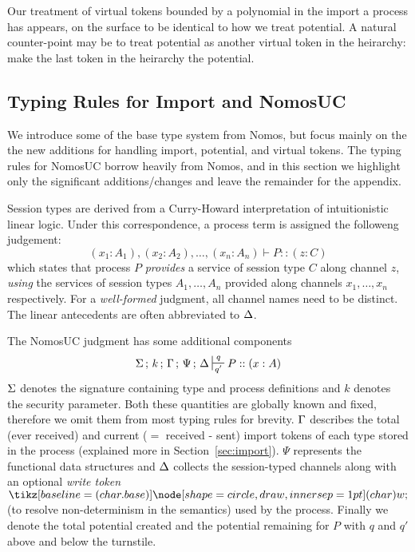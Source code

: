 Our treatment of virtual tokens bounded by a polynomial in the import a process has appears, on the surface to be identical to how we treat potential.
A natural counter-point may be to treat potential as another virtual token in the heirarchy: make the last token in the heirarchy the potential.




\subsection{Typing Rules for Import and NomosUC}
We introduce some of the base type system from Nomos, but focus mainly on the the new additions for handling import, potential, and virtual tokens. 
The typing rules for NomosUC borrow heavily from Nomos, and in this section we highlight only the significant additions/changes and leave the remainder for the appendix.

Session types are derived from a Curry-Howard interpretation of intuitionistic linear logic. 
Under this correspondence, a process term is assigned the followeng judgement: 
\[
(x_1 : A_1), (x_2 : A_2), \ldots, (x_n : A_n) \vdash P :: (z : C)
\]
which states that process $P$ \emph{provides} a service
of session type $C$ along channel $z$, \emph{using} the services of session
types $A_1, \ldots, A_n$ provided along channels $x_1, \ldots, x_n$ respectively.
For a \emph{well-formed} judgment, all channel names need to be distinct.
The linear antecedents are often abbreviated to $\Delta$.

The NomosUC judgment has some additional components
\[
\Sg \semi k \semi \Tokens \semi \Psi \semi \D \entailpot{q}{q'} P :: (x : A)
\]
$\Sigma$ denotes the signature containing type and process definitions and $k$
denotes the security parameter.
Both these quantities are globally known and fixed, therefore we omit them from
most typing rules for brevity.
$\Gamma$ describes the total (ever received) and current ($=$ received - sent) import tokens
of each type stored in the process (explained more in Section~\ref{sec:import}).
$\Psi$ represents the functional data structures and $\Delta$ collects the
session-typed channels along with an optional \emph{write token} $\wt$
(to resolve non-determinism in the semantics) used by the process.
Finally we denote the total potential created and the potential remaining for $P$ with $q$ and $q'$ above and below the turnstile.

